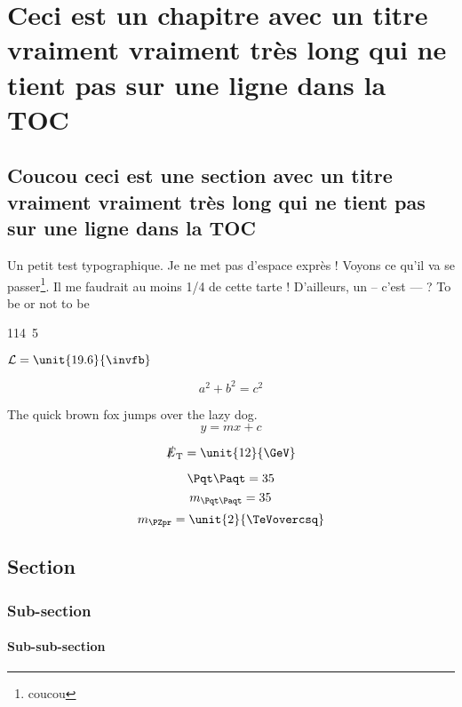 \documentclass[twoside,titlepage,paper=a4,fontsize=12pt,numbers=noenddot,cleardoublepage=empty,BCOR=5mm,openright]{scrreprt}
\begin{document}
\raggedbottom %

\pagestyle{plain} 



\cleardoublepage
\cleardoublepage

\pagestyle{scrheadings} %

\cleardoublepage %

\chapter{Ceci est un chapitre avec un titre vraiment vraiment très long qui ne tient pas sur une ligne dans la TOC}

\section{Coucou ceci est une section avec un titre vraiment vraiment très long qui ne tient pas sur une ligne dans la TOC}
  
Un petit test typographique. Je ne met pas d'espace exprès ! Voyons ce qu'il va se passer\footnote{coucou}. Il me faudrait au moins 1/4 de cette tarte ! D'ailleurs, un -- c'est --- ? To be or not to be \citep{Beneke:1997hv}

\unit{114.5}{\GeVoverc}

$\lumi = \unit{19.6}{\invfb}$

$$a^2 + b^2 = c^2$$

The quick brown fox jumps over the lazy dog.
\[ y = mx + c \]

$$ \MET = \unit{12}{\GeV} $$

$$ \ttbar = 35$$
$$ \mtt = 35$$
$$ \mzp = \unit{2}{\TeVcc} $$




\lipsum

\section{Section}
\subsection{Sub-section}
\subsubsection{Sub-sub-section}
\end{document}
